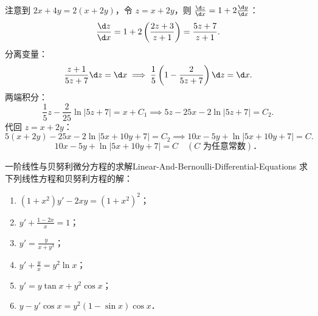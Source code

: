 \begin{solution}

    注意到 $2x + 4y = 2(x + 2y)$，令 $z = x + 2y$，则 $\frac{\d z}{\d x} = 1 + 2\frac{\d y}{\d x}$：
    \begin{equation}
        \frac{\d z}{\d x} = 1 + 2\left(\frac{2z + 3}{z + 1}\right) = \frac{5z + 7}{z + 1}.
    \end{equation}
    分离变量：
    \begin{equation}
        \frac{z + 1}{5z + 7}\d z = \d x \implies \frac{1}{5}\left( 1 - \frac{2}{5z + 7} \right)\d z = \d x.
    \end{equation}
    两端积分：
    \begin{equation}
        \frac{1}{5}z - \frac{2}{25}\ln|5z + 7| = x + C_1 \implies 5z - 25x - 2\ln|5z + 7| = C_2.
    \end{equation}
    代回 $z = x + 2y$：
    \begin{equation}
        5(x + 2y) - 25x - 2\ln|5x + 10y + 7| = C_2 \implies 10x - 5y + \ln|5x + 10y + 7| = C.
    \end{equation}
    \begin{equation}
        \boxed{10x - 5y + \ln|5x + 10y + 7| = C \quad (C \text{ 为任意常数})．}
    \end{equation}
\end{solution}

\begin{problem}{一阶线性与贝努利微分方程的求解}{Linear-And-Bernoulli-Differential-Equations}
    求下列线性方程和贝努利方程的解：
    \begin{enumerate}
        \item $(1+x^2)y' - 2xy = (1+x^2)^2$；
        \item $y' + \frac{1-2x}{x} = 1$；
        \item $y' = \frac{y}{x+y^3}$；
        \item $y' + \frac{y}{x} = y^2 \ln x$；
        \item $y' = y\tan x + y^2 \cos x$；
        \item $y - y'\cos x = y^2(1-\sin x)\cos x$．
    \end{enumerate}
\end{problem}

